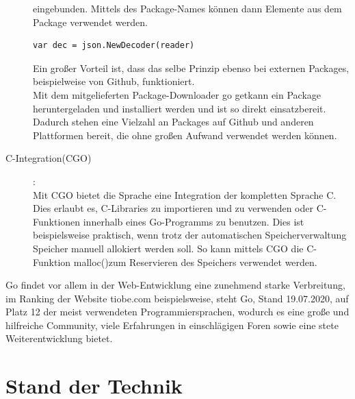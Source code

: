 \documentclass[a4paper,10pt]{scrartcl}
\begin{document}
\begin{description}
eingebunden. Mittels des Package-Names können dann Elemente aus dem Package verwendet werden.


\begin{lstlisting}
var dec = json.NewDecoder(reader)
\end{lstlisting}

Ein großer Vorteil ist, dass das selbe Prinzip ebenso bei externen Packages, beispielweise von Github, funktioniert.\\
Mit dem mitgelieferten Package-Downloader \glqq go get\grqq kann ein Package heruntergeladen und installiert werden und ist so direkt einsatzbereit. Dadurch stehen eine Vielzahl an Packages auf Github und anderen Plattformen bereit, die ohne großen Aufwand verwendet werden können.

\item[C-Integration(CGO)]:\\

Mit CGO bietet die Sprache eine Integration der kompletten Sprache C. Dies erlaubt es,  C-Libraries zu importieren und zu verwenden oder C-Funktionen innerhalb eines Go-Programms zu benutzen. Dies ist beispielsweise praktisch, wenn trotz der automatischen Speicherverwaltung Speicher manuell allokiert werden soll. So kann mittels CGO die C-Funktion \glqq malloc()\grqq zum Reservieren des Speichers verwendet werden.

\end{description}

Go findet vor allem in der Web-Entwicklung eine zunehmend starke Verbreitung, im Ranking der Website tiobe.com beispielsweise, steht Go, Stand 19.07.2020, auf Platz 12 der meist verwendeten Programmiersprachen\cite{.04.07.2020}, wodurch es eine große und hilfreiche Community, viele Erfahrungen in einschlägigen Foren sowie eine stete Weiterentwicklung bietet.\\

\pagebreak

\section{Stand der Technik}
\end{document}
